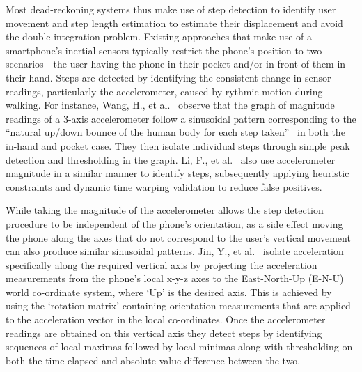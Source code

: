 \documentclass[main.tex]{subfiles}
\begin{document}
Most dead-reckoning systems thus make use of step detection to identify user movement and step length estimation to estimate their displacement and avoid the double integration problem. Existing approaches that make use of a smartphone’s inertial sensors typically restrict the phone’s position to two scenarios - the user having the phone in their pocket and/or in front of them in their hand. Steps are detected by identifying the consistent change in sensor readings, particularly the accelerometer, caused by rythmic motion during walking. For instance, Wang, H., et al.~\cite{wang2012no} observe that the graph of magnitude readings of a 3-axis accelerometer follow a sinusoidal pattern corresponding to the ``natural up/down bounce of the human body for each step taken''~\cite[p.203]{wang2012no} in both the in-hand and pocket case. They then isolate individual steps through simple peak detection and thresholding in the graph. Li, F., et al.~\cite{li2012reliable} also use accelerometer magnitude in a similar manner to identify steps, subsequently applying heuristic constraints and dynamic time warping validation to reduce false positives.  

While taking the magnitude of the accelerometer allows the step detection procedure to be independent of the phone’s orientation, as a side effect moving the phone along the axes that do not correspond to the user’s vertical movement can also produce similar sinusoidal patterns. Jin, Y., et al.~\cite{jin2011robust} isolate acceleration specifically along the required vertical axis by projecting the acceleration measurements from the phone’s local x-y-z axes to the East-North-Up (E-N-U) world co-ordinate system, where `Up' is the desired axis.  This is achieved by using the `rotation matrix' containing orientation measurements that are applied to the acceleration vector in the local co-ordinates. Once the accelerometer readings are obtained on this vertical axis they detect steps by identifying sequences of local maximas followed by local minimas along with thresholding on both the time elapsed and absolute value difference between the two. 
\end{document}
